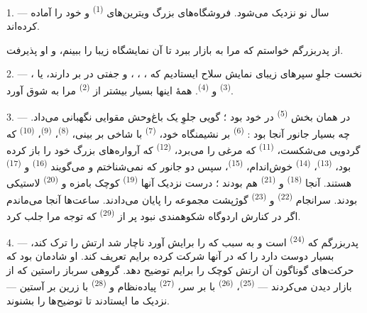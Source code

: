 \VUsaut{4.0mm}
\VUsaut{2.0mm}
\VUsaut{3.4mm}

1. --- سال نو نزدیک می‌شود. فروشگاه‌های بزرگ ویترین‌های
 \textsuperscript{(1)} و 
خود را آماده کرده‌اند.

از پدربزرگم خواستم که مرا به بازار ببرد تا آن نمایشگاه زیبا را ببینم،
و او پذیرفت.

2. --- نخست جلوِ سپرهای زیبای نمایش سلاح ایستادیم که ،
، ،  و جفتی
 در بر دارند، یا ، 
\textsuperscript{(3)} و  \textsuperscript{(4)}. همهٔ
اینها بسیار بیشتر از  \textsuperscript{(2)} مرا به
شوق آورد.

\VUsaut{3.0mm}
\VUsaut{2.6mm}

3. --- در همان بخش  \textsuperscript{(5)} در
 خود بود ؛ گویی جلوِ یک باغ‌وحش مقوایی نگهبانی می‌داد.
چه بسیار جانور آنجا بود :  \textsuperscript{(6)} بر
نشیمنگاه خود،  \textsuperscript{(7)} با شاخی بر بینی،
 \textsuperscript{(8)}، 
\textsuperscript{(9)}،  \textsuperscript{(10)} که گردویی
می‌شکست،  \textsuperscript{(11)} که مرغی را می‌برد،
 \textsuperscript{(12)} که آرواره‌های بزرگ خود را باز
کرده بود،  \textsuperscript{(13)}، 
\textsuperscript{(14)} خوش‌اندام، 
\textsuperscript{(15)}، سپس دو جانور که نمی‌شناختم و می‌گویند
 \textsuperscript{(16)} و 
\textsuperscript{(17)} هستند. آنجا  \textsuperscript{(18)}
و  \textsuperscript{(21)} هم بودند ؛ درست نزدیک آنها
 \textsuperscript{(19)} کوچک بامزه و  \textsuperscript{(20)} لاستیکی بودند. سرانجام 
\textsuperscript{(22)} و  \textsuperscript{(23)}
گوژپشت مجموعه را پایان می‌دادند. ساعت‌ها آنجا می‌ماندم اگر در کنارش
اردوگاه شکوهمندی نبود پر از 
\textsuperscript{(29)} که توجه مرا جلب کرد.

\VUsaut{4.0mm}
\VUsaut{2.8mm}

4. --- پدربزرگم که  \textsuperscript{(24)} است و به سبب
 که  را برایش آورد ناچار شد ارتش را
ترک کند، بسیار دوست دارد  را که در آنها شرکت کرده
برایم تعریف کند. او شادمان بود که حرکت‌های گوناگون آن ارتش کوچک را
برایم توضیح دهد. گروهی سرباز راستین که از بازار دیدن می‌کردند —
 \textsuperscript{(25)}، 
\textsuperscript{(26)} با  بر سر، 
\textsuperscript{(27)} پیاده‌نظام و 
\textsuperscript{(28)} با  زرین بر آستین — نزدیک ما
ایستادند تا توضیح‌ها را بشنوند.

